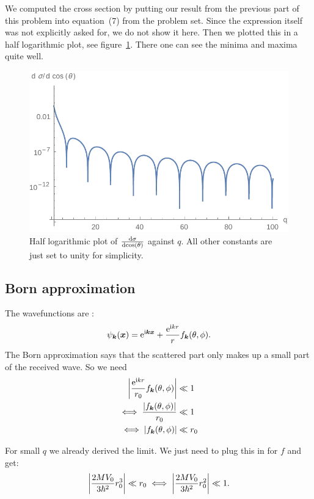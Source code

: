 \documentclass[11pt, english, fleqn, DIV=15, headinclude, BCOR=1.5cm]{scrartcl}
\begin{document}
We computed the cross section by putting our result from the previous part of
this problem into equation~(7) from the problem set. Since the expression
itself was not explicitly asked for, we do not show it here. Then we plotted
this in a half logarithmic plot, see figure~\ref{fig:logplot}. There one can
see the minima and maxima quite well.

\begin{figure}[htbp]
    \centering
    \includegraphics[width=.7\linewidth]{logplot.pdf}
    \caption{%
        Half logarithmic plot of $\frac{\mathop{}\!\mathrm d {\sigma}}{\mathop{}\!\mathrm d {\cos(\theta)}}$ against $q$. All
        other constants are just set to unity for simplicity.
    }
    \label{fig:logplot}
\end{figure}

\subsection{Born approximation}

The wavefunctions are \parencite[(18.9)]{Schwabl/Quantenmechanik}:
\[
    \psi_{\boldsymbol{k}}(\boldsymbol{x}) = \mathrm e^{\mathrm i \boldsymbol{k} \boldsymbol{x}} + \frac{\mathrm e^{\mathrm i kr}}r
    f_{\boldsymbol{k}}(\theta, \phi).
\]
The Born approximation says that the scattered part only makes up a small part
of the received wave. So we need
\begin{align*}
    \left| \frac{\mathrm e^{\mathrm i kr}}{r_0} f_{\boldsymbol{k}}(\theta, \phi) \right| &\ll 1 \\
    \iff \frac{|f_{\boldsymbol{k}}(\theta, \phi)|}{r_0} &\ll 1 \\
    \iff |f_{\boldsymbol{k}}(\theta, \phi)| &\ll r_0
\end{align*}

For small $q$ we already derived the limit. We just need to plug this in for
$f$ and get:
\[
    \left| \frac{2MV_0}{3\hbar^2} r_0^3 \right| \ll r_0
    \iff
    \left| \frac{2MV_0}{3\hbar^2} r_0^2 \right| \ll 1.
\]
\end{document}
